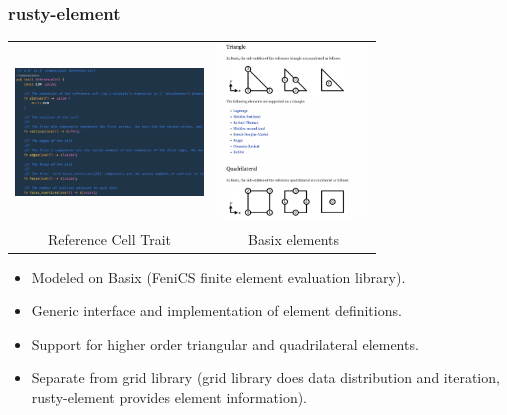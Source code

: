 \documentclass[dvipsnames,10pt]{beamer}
\begin{document}
\begin{frame}
\frametitle{rusty-element}

\begin{center}
\begin{tabular}{cc}
\includegraphics[width=5cm]{../figs/rusty_element} &
\includegraphics[width=4cm]{../figs/basix_elements}\\
Reference Cell Trait & {\small Basix elements}
\end{tabular}
\end{center}

\begin{itemize}
\item Modeled on Basix (FeniCS finite element evaluation library).
\item Generic interface and implementation of element definitions.
\item Support for higher order triangular and quadrilateral elements.
\item Separate from grid library (grid library does data distribution and
iteration, rusty-element provides element information).
\end{itemize}

\end{frame}
\end{document}
